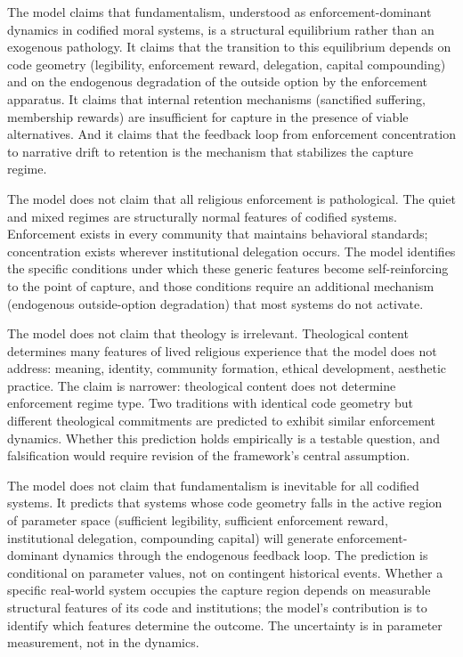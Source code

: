 \documentclass[12pt]{article}
\begin{document}
The model claims that fundamentalism, understood as enforcement-dominant dynamics in codified moral systems, is a structural equilibrium rather than an exogenous pathology. It claims that the transition to this equilibrium depends on code geometry (legibility, enforcement reward, delegation, capital compounding) and on the endogenous degradation of the outside option by the enforcement apparatus. It claims that internal retention mechanisms (sanctified suffering, membership rewards) are insufficient for capture in the presence of viable alternatives. And it claims that the feedback loop from enforcement concentration to narrative drift to retention is the mechanism that stabilizes the capture regime.

The model does not claim that all religious enforcement is pathological. The quiet and mixed regimes are structurally normal features of codified systems. Enforcement exists in every community that maintains behavioral standards; concentration exists wherever institutional delegation occurs. The model identifies the specific conditions under which these generic features become self-reinforcing to the point of capture, and those conditions require an additional mechanism (endogenous outside-option degradation) that most systems do not activate.

The model does not claim that theology is irrelevant. Theological content determines many features of lived religious experience that the model does not address: meaning, identity, community formation, ethical development, aesthetic practice. The claim is narrower: theological content does not determine enforcement regime type. Two traditions with identical code geometry but different theological commitments are predicted to exhibit similar enforcement dynamics. Whether this prediction holds empirically is a testable question, and falsification would require revision of the framework's central assumption.

The model does not claim that fundamentalism is inevitable for all codified systems. It predicts that systems whose code geometry falls in the active region of parameter space (sufficient legibility, sufficient enforcement reward, institutional delegation, compounding capital) will generate enforcement-dominant dynamics through the endogenous feedback loop. The prediction is conditional on parameter values, not on contingent historical events. Whether a specific real-world system occupies the capture region depends on measurable structural features of its code and institutions; the model's contribution is to identify which features determine the outcome. The uncertainty is in parameter measurement, not in the dynamics.
\end{document}
